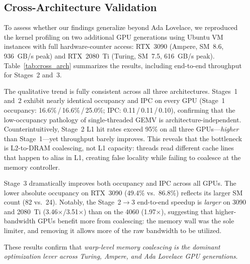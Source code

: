 \documentclass[conference]{IEEEtran}
\begin{document}
\subsection{Cross-Architecture Validation}
\label{sec:cross_arch}

To assess whether our findings generalize beyond Ada Lovelace, we reproduced the kernel profiling on two additional GPU generations using Ubuntu VM instances with full hardware-counter access: RTX~3090 (Ampere, SM~8.6, 936~GB/s peak) and RTX~2080~Ti (Turing, SM~7.5, 616~GB/s peak). Table~\ref{tab:cross_arch} summarizes the results, including end-to-end throughput for Stages~2 and~3.

The qualitative trend is fully consistent across all three architectures. Stages~1 and~2 exhibit nearly identical occupancy and IPC on every GPU (Stage~1 occupancy: 16.6\%\,/\,16.6\%\,/\,25.0\%; IPC: 0.11\,/\,0.11\,/\,0.10), confirming that the low-occupancy pathology of single-threaded GEMV is architecture-independent. Counterintuitively, Stage~2 L1 hit rates exceed 95\% on all three GPUs---\emph{higher} than Stage~1---yet throughput barely improves. This reveals that the bottleneck is L2-to-DRAM coalescing, not L1 capacity: threads read different cache lines that happen to alias in L1, creating false locality while failing to coalesce at the memory controller.

Stage~3 dramatically improves both occupancy and IPC across all GPUs. The lower absolute occupancy on RTX~3090 (49.4\% vs.\ 86.8\%) reflects its larger SM count (82 vs.\ 24). Notably, the Stage~2$\to$3 end-to-end speedup is \emph{larger} on 3090 and 2080~Ti (3.46$\times$/3.51$\times$) than on the 4060 (1.97$\times$), suggesting that higher-bandwidth GPUs benefit more from coalescing: the memory wall was the sole limiter, and removing it allows more of the raw bandwidth to be utilized.

These results confirm that \emph{warp-level memory coalescing is the dominant optimization lever across Turing, Ampere, and Ada Lovelace GPU generations}.
\end{document}
